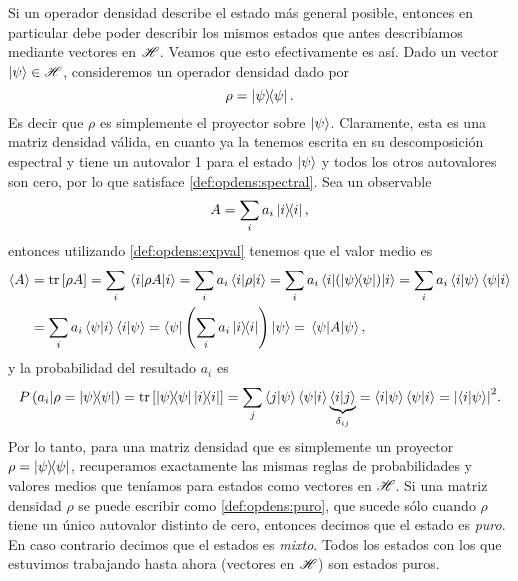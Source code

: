 \documentclass[10pt, a4paper]{article}
\numberwithin{equation}{subsection}
\begin{document}
Si un operador densidad describe el estado más general posible, entonces en
particular debe poder describir los mismos estados que antes describíamos
mediante vectores en $\mathscr{H}$. Veamos que esto efectivamente es así.
Dado un vector $\ket{\psi} \in \mathscr{H}$, consideremos un operador densidad
dado por
\begin{equation} \label{def:opdens:puro}
  \rho = \projector{\psi}.
\end{equation}
Es decir que $\rho$ es simplemente el proyector sobre $\ket{\psi}$. Claramente,
esta es una matriz densidad válida, en cuanto ya la tenemos escrita en su
descomposición espectral y tiene un autovalor 1 para el estado $\ket{\psi}$ y
todos los otros autovalores son cero, por lo que satisface
\eqref{def:opdens:spectral}. Sea un observable
\begin{equation}
  A = \sum_i a_i\projector{i},
\end{equation}
entonces utilizando \eqref{def:opdens:expval} tenemos que el valor medio es
\begin{align}
  \expval{A} &= \tr\left[\rho A\right]
  = \sum_i \matrixel{i}{\rho A}{i}
  = \sum_i a_i \matrixel{i}{\rho}{i}
  = \sum_i a_i \matrixel{i}{\left(\projector{\psi}\right)}{i}
  = \sum_i a_i \braket{i}{\psi} \braket{\psi}{i} \nonumber \\
  &= \sum_i a_i \braket{\psi}{i} \braket{i}{\psi}
  = \bra{\psi}\left(\sum_i a_i \projector{i}\right)\ket{\psi}
  = \matrixel{\psi}{A}{\psi},
\end{align}
y la probabilidad del resultado $a_i$ es
\begin{align}
  \ProbCond{a_i}{\rho = \projector{\psi}}
  = \tr\left[\projector{\psi} \projector{i}\right]
  = \sum_j \braket{j}{\psi} \braket{\psi}{i}
    \underbrace{\braket{i}{j}}_{\delta_{ij}}
  = \braket{i}{\psi} \braket{\psi}{i} = \abs{\braket{i}{\psi}}^2.
\end{align}
Por lo tanto, para una matriz densidad que es simplemente un proyector $\rho =
\projector{\psi}$, recuperamos exactamente las mismas reglas de probabilidades
y valores medios que teníamos para estados como vectores en $\mathscr{H}$. Si una
matriz densidad $\rho$ se puede escribir como \eqref{def:opdens:puro}, que
sucede sólo cuando $\rho$ tiene un único autovalor distinto de cero, entonces
decimos que el estado es \emph{puro}. En caso contrario decimos que el estados
es \emph{mixto}. Todos los estados con los que estuvimos trabajando hasta ahora
(vectores en $\mathscr{H}$) son estados puros.

\end{document}
